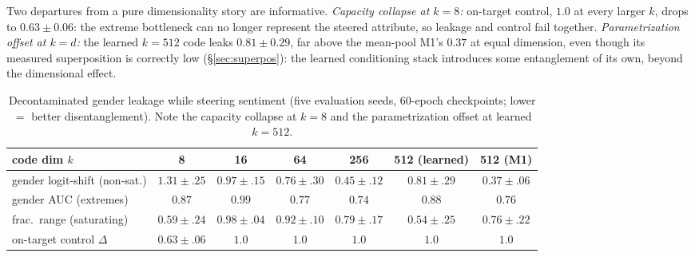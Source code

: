 \documentclass[11pt]{article}
\begin{document}
Two departures from a pure
dimensionality story are informative. \emph{Capacity collapse at $k{=}8$:} on-target
control, $1.0$ at every larger $k$, drops to $0.63\!\pm\!0.06$: the extreme bottleneck
can no longer represent the steered attribute, so leakage and control fail together.
\emph{Parametrization offset at $k{=}d$:} the learned $k{=}512$ code leaks
$0.81\!\pm\!0.29$, far above the mean-pool M1's $0.37$ at equal dimension, even though
its measured superposition is correctly low (\S\ref{sec:superpos}): the learned
conditioning stack introduces some entanglement of its own, beyond the dimensional
effect.

\begin{table}[h]\centering\small
\begin{tabular}{l cccccc}
code dim $k$ & 8 & 16 & 64 & 256 & 512 (learned) & 512 (M1) \\
\hline
gender logit-shift (non-sat.) & $1.31\!\pm\!.25$ & $0.97\!\pm\!.15$ & $0.76\!\pm\!.30$ & $0.45\!\pm\!.12$ & $0.81\!\pm\!.29$ & $0.37\!\pm\!.06$ \\
gender AUC (extremes)         & $0.87$ & $0.99$ & $0.77$ & $0.74$ & $0.88$ & $0.76$ \\
frac.\ range (saturating)     & $0.59\!\pm\!.24$ & $0.98\!\pm\!.04$ & $0.92\!\pm\!.10$ & $0.79\!\pm\!.17$ & $0.54\!\pm\!.25$ & $0.76\!\pm\!.22$ \\
on-target control $\Delta$    & $\mathbf{0.63\!\pm\!.06}$ & $1.0$ & $1.0$ & $1.0$ & $1.0$ & $1.0$ \\
\end{tabular}
\caption{Decontaminated gender leakage while steering sentiment (five evaluation
seeds, 60-epoch checkpoints; lower $=$ better disentanglement). Note the capacity
collapse at $k{=}8$ and the parametrization offset at learned $k{=}512$.}
\label{tab:leakrobust}
\end{table}
\end{document}
